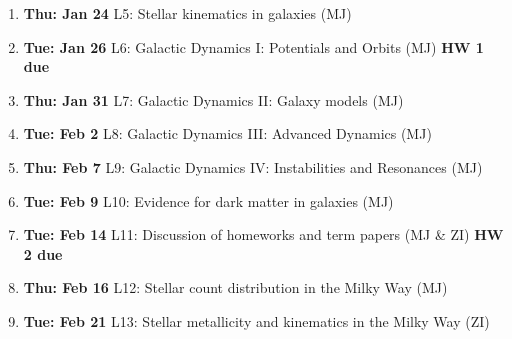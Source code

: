 \documentclass[10pt]{article}
\begin{document}
\begin{enumerate}
  \item {\bf Thu: Jan 24}  L5: Stellar kinematics in galaxies (MJ)
  \item {\bf Tue: Jan 26}  L6: Galactic Dynamics I: Potentials and Orbits (MJ) {\bf HW 1 due}
  \item {\bf Thu: Jan 31}  L7: Galactic Dynamics II: Galaxy models (MJ)
  \item {\bf Tue: Feb 2}   L8: Galactic Dynamics III: Advanced Dynamics (MJ)
  \item {\bf Thu: Feb 7}   L9: Galactic Dynamics IV: Instabilities and Resonances (MJ)
  \item {\bf Tue: Feb 9}   L10: Evidence for dark matter in galaxies (MJ)
  \item {\bf Tue: Feb 14}  L11: Discussion of homeworks and term papers (MJ \& ZI) {\bf HW 2 due}
  \item {\bf Thu: Feb 16}  L12: Stellar count distribution in the Milky Way (MJ)
  \item {\bf Tue: Feb 21}  L13: Stellar metallicity and kinematics in the Milky Way (ZI)

\end{enumerate}
\end{document}
